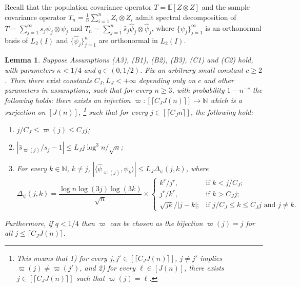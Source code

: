 \documentclass[aos]{imsart}
\renewcommand{\hat}{\widehat}
\theoremstyle{plain}
\newtheorem{lemma}{Lemma}[section]
\theoremstyle{definition}
\theoremstyle{definition}
\begin{document}
Recall that the population covariance operator $T=\mathbb E[Z\otimes Z]$ and the sample covariance operator $T_n=\frac{1}{n}\sum_{i=1}^nZ_i\otimes Z_i$ admit spectral decomposition of
$T=\sum_{j=1}^{\infty}s_j\psi_j\otimes\psi_j$ and $T_n=\sum_{j=1}^n\hat s_j\hat\psi_j\otimes\hat\psi_j$, where $\{\psi_j\}_{j=1}^{\infty}$ is an orthonormal basis of $L_2(I)$ and $\{\hat\psi_j\}_{j=1}^n$ are orthonormal in $L_2(I)$.
\begin{lemma}
Suppose Assumptions (A3), (B1), (B2), (B3), (C1) and (C2) hold, with parameters $\kappa<1/4$ and $q\in(0,1/2)$.
Fix an arbitrary small constant $c\geq 2$.
Then there exist constants $C_J,L_J<+\infty$ depending only on $c$ and other parameters in assumptions, such that for every $n\geq 3$, 
with probability $1-n^{-c}$ the following holds: there exists an injection $\varpi:[\lceil C_J J(n)\rceil]\to \mathbb N$ which is a surjection on $[J(n)]$,
\footnote{This means that 1) for every $j,j'\in[\lceil C_JJ(n)\rceil]$, $j\neq j'$ implies $\varpi(j)\neq\varpi(j')$, and 2) for every $\ell\in[J(n)]$, there exists $j\in[\lceil C_JJ(n)\rceil]$ such that $\varpi(j)=\ell$.}
 such that for every $j\in[\lceil C_J n\rceil]$, the following hold:
\begin{enumerate}
\item $j/C_J\leq \varpi(j)\leq C_J j$;
\item $|\hat s_{\varpi(j)}/s_j-1|\leq L_J j\log^3 n/\sqrt{n}$;
\item For every $k\in\mathbb N$, $k\neq j$, $|\langle\hat\psi_{\varpi(j)},\psi_k\rangle|\leq L_J\Delta_\psi(j,k)$, where
$$
\Delta_\psi(j,k) = \frac{\log n\log(3j)\log(3k)}{\sqrt{n}}\times \left\{\begin{array}{ll} k^r/j^r,& \text{if }k< j/C_J;\\ j^r/k^r,& \text{if } k> C_Jj;\\ \sqrt{jk}/|j-k|;& \text{if $j/C_J \leq k \leq C_Jj$ and $j\neq k$.}\end{array}\right.
$$
\end{enumerate}
Furthermore, if $q<1/4$ then $\varpi$ can be chosen as the bijection $\varpi(j)=j$ for all $j\leq \lceil C_JJ(n)\rceil$.
\label{lem:stability}
\end{lemma}

\end{document}
